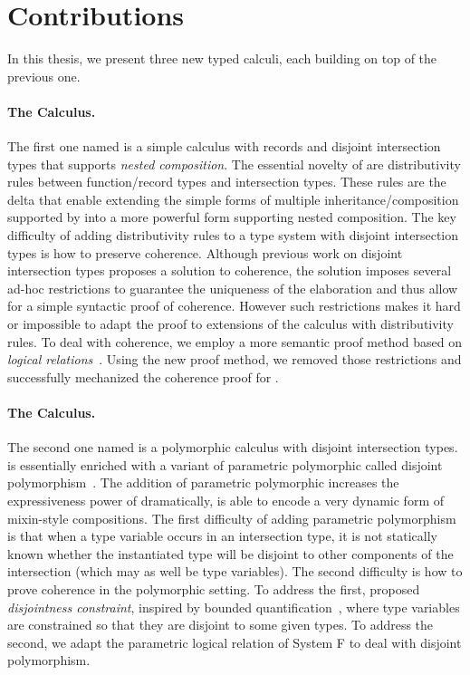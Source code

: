\section{Contributions}

In this thesis, we present three new typed calculi, each building on top of the previous one.

\paragraph{The \namee Calculus.}

The first one named \namee is a simple calculus with records and disjoint
intersection types that supports \emph{nested composition}. The essential
novelty of \namee are distributivity rules between function/record types and
intersection types. These rules are the delta that enable extending the simple
forms of multiple inheritance/composition supported by \oname into a more
powerful form supporting nested composition. The key difficulty of adding
distributivity rules to a type system with disjoint intersection types is how to
preserve coherence. Although previous work on disjoint intersection types
proposes a solution to coherence, the solution imposes several ad-hoc
restrictions to guarantee the uniqueness of the elaboration and thus allow for a
simple syntactic proof of coherence. However such restrictions makes it hard or
impossible to adapt the proof to extensions of the calculus with distributivity
rules. To deal with coherence, we employ a more semantic proof method based on
\emph{logical relations}~\citep{tait, plotkin1973lambda, statman1985logical}.
Using the new proof method, we removed those restrictions and successfully
mechanized the coherence proof for \namee.

\paragraph{The \fnamee Calculus.}

The second one named \fnamee is a polymorphic calculus with disjoint
intersection types. \fnamee is essentially \namee enriched with a variant of
parametric polymorphic called disjoint polymorphism~\citep{alpuimdisjoint}. The
addition of parametric polymorphic increases the expressiveness power of \namee
dramatically, \fnamee is able to encode a very dynamic form of mixin-style
compositions. The first difficulty of adding parametric polymorphism is that
when a type variable occurs in an intersection type, it is not statically known
whether the instantiated type will be disjoint to other components of the
intersection (which may as well be type variables). The second difficulty is how
to prove coherence in the polymorphic setting. To address the first, \citet{alpuimdisjoint}
proposed \textit{disjointness constraint}, inspired by bounded
quantification~\citep{cardelli1994extension}, where type variables are constrained so that they are disjoint
to some given types. To address the second, we adapt the parametric logical
relation of System F to deal with disjoint polymorphism.



